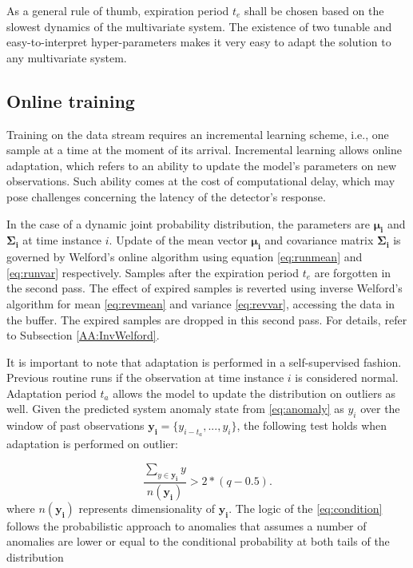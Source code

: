As a general rule of thumb, expiration period $t_e$ shall be chosen based on the slowest dynamics of the multivariate system. The existence of two tunable and easy-to-interpret hyper-parameters makes it very easy to adapt the solution to any multivariate system.

\subsection{Online training}\label{train}
Training on the data stream requires an incremental learning scheme, i.e., one sample at a time at the moment of its arrival. Incremental learning allows online adaptation, which refers to an ability to update the model's parameters on new observations. Such ability comes at the cost of computational delay, which may pose challenges concerning the latency of the detector's response. 

In the case of a dynamic joint probability distribution, the parameters are $\boldsymbol{\mu_i}$ and $\boldsymbol{\Sigma_i}$ at time instance \(i\). Update of the mean vector $\boldsymbol{\mu_i}$ and covariance matrix $\boldsymbol{\Sigma_i}$ is governed by Welford's online algorithm using equation \eqref{eq:runmean} and \eqref{eq:runvar} respectively. Samples after the expiration period $t_e$ are forgotten in the second pass. The effect of expired samples is reverted using inverse Welford's algorithm for mean \eqref{eq:revmean} and variance \eqref{eq:revvar}, accessing the data in the buffer. The expired samples are dropped in this second pass. For details, refer to Subsection \ref{AA:InvWelford}.

It is important to note that adaptation is performed in a self-supervised fashion. Previous routine runs if the observation at time instance \(i\) is considered normal. Adaptation period $t_a$ allows the model to update the distribution on outliers as well. Given the predicted system anomaly state from \eqref{eq:anomaly} as $y_i$  over the window of past observations \(\boldsymbol{y_i}=\{y_{i-t_a},...,y_{i}\}\), the following test holds when adaptation is performed on outlier:

\begin{equation}
{\frac{\sum_{y\in \boldsymbol{y_i}}y}{n(\boldsymbol{y_i})}} > 2*(q-0.5)\text{.}\label{eq:condition}
\end{equation}
where \(n(\boldsymbol{y_i})\) represents dimensionality of \(\boldsymbol{y_i}\). The logic of the \eqref{eq:condition} follows the probabilistic approach to anomalies that assumes a number of anomalies are lower or equal to the conditional probability at both tails of the distribution

